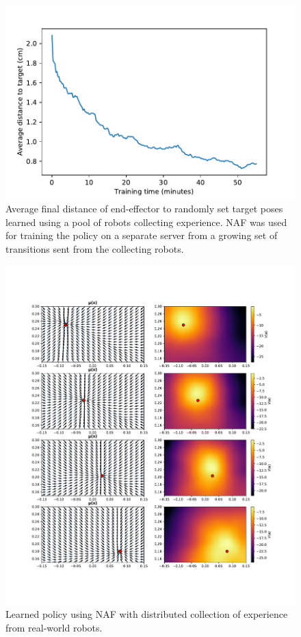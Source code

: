 \begin{figure}[h!]
    \centering
    \includegraphics[width=0.50 \textwidth]{res/uarm_moving_goal_progress.pdf}

    \caption{Average final distance of end-effector to randomly set target
    poses learned using a pool of robots collecting experience. NAF was used
    for training the policy on a separate server from a growing set of
    transitions sent from the collecting robots.}
    \label{fig:uarm_moving_goal_progress}
    
\end{figure}

\begin{figure}[h]
    \centering
    \includegraphics[width=\textwidth]{res/multiple_goals_uarm.pdf}

    \caption{Learned policy using NAF with distributed collection of experience
    from real-world robots.}

    \label{fig:uarm_moving_goal_policy}
    
\end{figure}

%
%    
